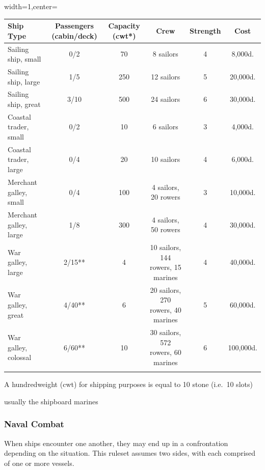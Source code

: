 \documentclass{book}
\begin{document}
\begin{table}[h]
	\begin{adjustbox}{width=1\textwidth,center=\textwidth}
	\begin{threeparttable}
	\begin{tabular}{lccccc}
		\toprule\noalign{}
			Ship Type & 
			Passengers (cabin/deck) & 
			Capacity (cwt*) & Crew & 
			Strength & Cost \\
		\midrule\noalign{}
			Sailing ship, small & 0/2 & 70 & 8 sailors & 4 & 8,000d. \\
			Sailing ship, large & 1/5 & 250 & 12 sailors & 5 & 20,000d. \\
			Sailing ship, great & 3/10 & 500 & 24 sailors & 6 & 30,000d. \\
			Coastal trader, small & 0/2 & 10 & 6 sailors & 3 & 4,000d. \\
			Coastal trader, large & 0/4 & 20 & 10 sailors & 4 & 6,000d. \\
			Merchant galley, small & 0/4 & 100 & 4 sailors, 20 rowers & 3 &
			10,000d. \\
			Merchant galley, large & 1/8 & 300 & 4 sailors, 50 rowers & 4 &
			30,000d. \\
			War galley, large & 2/15** & 4 & 10 sailors, 144 rowers, 15 marines & 4
			& 40,000d. \\
			War galley, great & 4/40** & 6 & 20 sailors, 270 rowers, 40 marines & 5
			& 60,000d. \\
			War galley, colossal & 6/60** & 10 & 30 sailors, 572 rowers, 60 marines
			& 6 & 100,000d. \\
		\bottomrule\noalign{}
	\end{tabular}
	\begin{tablenotes}
		\item [*] A hundredweight (cwt) for shipping purposes is equal to 10 stone (i.e.~10 slots)
		\item [**] usually the shipboard marines
	\end{tablenotes}
	\end{threeparttable}
	\end{adjustbox}
\end{table}

\subsubsection*{Naval Combat}\label{naval-combat}

When ships encounter one another, they may end up in a confrontation
depending on the situation. This ruleset assumes two sides, with each
comprised of one or more vessels.
\end{document}
